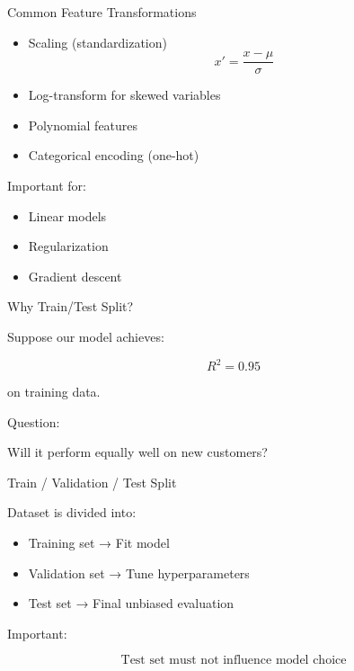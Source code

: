 \documentclass{beamer}
\begin{document}
\begin{frame}{Common Feature Transformations}

\begin{itemize}
    \item Scaling (standardization)
    \[
    x' = \frac{x - \mu}{\sigma}
    \]

    \item Log-transform for skewed variables

    \item Polynomial features

    \item Categorical encoding (one-hot)
\end{itemize}

\vspace{0.5cm}

Important for:

\begin{itemize}
    \item Linear models
    \item Regularization
    \item Gradient descent
\end{itemize}

\end{frame}

\begin{frame}{Why Train/Test Split?}

Suppose our model achieves:

\[
R^2 = 0.95
\]

on training data.

\vspace{0.5cm}

Question:

Will it perform equally well on new customers?

\end{frame}

\begin{frame}{Train / Validation / Test Split}

Dataset is divided into:

\begin{itemize}
    \item Training set → Fit model
    \item Validation set → Tune hyperparameters
    \item Test set → Final unbiased evaluation
\end{itemize}

\vspace{0.5cm}

Important:

\[
\text{Test set must not influence model choice}
\]

\end{frame}
\end{document}
